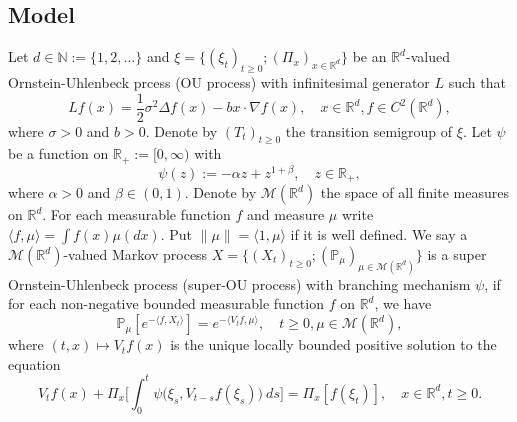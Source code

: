 \documentclass[12pt]{amsart}
\theoremstyle{plain}
\theoremstyle{definition}
\numberwithin{equation}{section}
\begin{document}
\subsection{Model}
    Let $d \in \mathbb N:= \{1,2,\dots\}$ and
    $\xi=\{(\xi_t)_{t\geq 0}; (\Pi_x)_{x\in \mathbb R^d}\}$ be an $\mathbb R^d$-valued Ornstein-Uhlenbeck prcess (OU process) with infinitesimal generator $L$ such that
\begin{equation}
\label{eq: OU generator}
    Lf(x)
        = \frac{1}{2}\sigma^2\Delta f(x)-b x \cdot \nabla f(x),
        \quad  x\in \mathbb R^d,
        f \in C^2(\mathbb{R}^d),
\end{equation}
    where $\sigma>0$ and $b>0$.
    Denote by $(T_t)_{t\geq 0}$ the transition semigroup of $\xi$.
    Let $\psi$ be a function on $\mathbb R_+:= [0,\infty)$ with
\begin{equation}\label{mechanism}
    \psi(z)
    := - \alpha z + z^{1+\beta},
    \quad z \in \mathbb R_+,
\end{equation}
	where $\alpha > 0$ and $\beta \in (0,1) $.
    Denote by $\mathcal{M}(\mathbb{R}^d)$ the space of all finite measures on $\mathbb{R}^d$.
    For each measurable function $f$ and measure $\mu$ write $\langle f,\mu\rangle = \int f(x)\mu(dx)$.
    Put $\|\mu\|=\langle 1,\mu\rangle$ if it is well defined.
    We say a $\mathcal{M}(\mathbb{R}^d)$-valued Markov process $X = \{(X_t)_{t\geq 0}; (\mathbb{P}_{\mu})_{\mu \in \mathcal M(\mathbb R^d)}\}$ is a super Ornstein-Uhlenbeck process (super-OU process) with branching mechanism $\psi$, if for each non-negative bounded measurable function $f$ on $\mathbb{R}^d$, we have
\begin{equation} \label{super}
    \mathbb{P}_{\mu}[e^{-\langle f,X_t \rangle}]
    = e^{-\langle V_tf, \mu \rangle},
    \quad t\geq 0, \mu \in \mathcal M(\mathbb R^d),
\end{equation}
	where $(t,x) \mapsto V_tf(x)$ is the unique locally bounded positive solution to the equation
\begin{equation}\label{eq1}
	V_tf(x) + \Pi_x \Big[ \int_0^t\psi\big(\xi_s,V_{t-s}f(\xi_s)\big)~ds\Big]
	= \Pi_x [f(\xi_t)],
    \quad x\in \mathbb R^d, t\geq 0.
\end{equation}	
\end{document}
